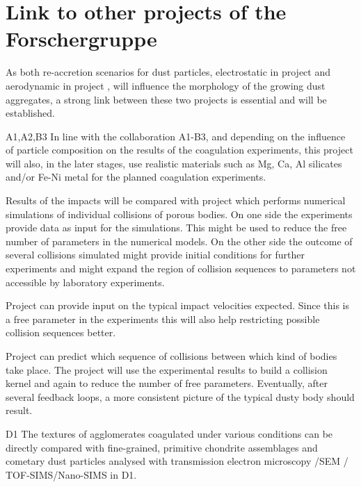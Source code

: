 \section{Link to other projects of the Forschergruppe}
\begin{linkproj}
\item[\projblum{}] As both re-accretion scenarios for dust
particles, electrostatic in project \projblum{} and aerodynamic in
project \projwurm{}, will influence the morphology of the growing
dust aggregates, a strong link between these two projects is
essential and will be established.

\item[A1,A2,B3] In line with the collaboration A1-B3, and depending on 
the influence of particle composition on the results of the coagulation
experiments, this project will also, in the later stages, 
use realistic materials such as Mg, Ca,
Al silicates and/or Fe-Ni metal for the planned coagulation experiments.

\item[\projkley{}] Results of the impacts will be compared with project
\projkley{} which performs numerical simulations of individual collisions of
porous bodies. On one side the experiments provide data as input for the
simulations. This might be used to reduce the free number of parameters in the
numerical models. On the other side the outcome of several collisions simulated
might provide initial conditions for further experiments and might expand
the region of collision sequences to parameters not accessible by laboratory
experiments.

\item[\projklahr{}] Project \projklahr{} can provide input on the typical
impact velocities expected. Since this is a free parameter in the experiments this
will also help restricting possible collision sequences better.
\item[\projdul{}] Project \projdul{} can predict which sequence of collisions
between which kind of bodies take place. The project will use the experimental results
to build a collision kernel and again to reduce the number of free parameters.
Eventually, after several feedback
loops, a more consistent picture of the typical dusty body should result.

\item[D1] The textures of agglomerates coagulated under various conditions 
can be directly compared with fine-grained, primitive chondrite assemblages
and cometary dust particles analysed with transmission electron microscopy
/SEM / TOF-SIMS/Nano-SIMS in D1.

\end{linkproj}



